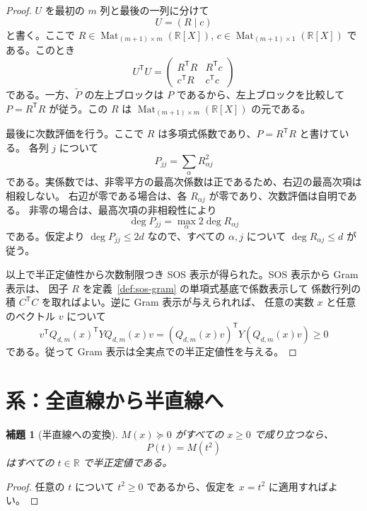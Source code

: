 \documentclass[uplatex,dvipdfmx]{jsarticle}
\newcommand{\Poly}{\mathbb{R}[X]}
\newcommand{\Mat}{\operatorname{Mat}}
\newcommand{\psd}{\succeq 0}
\theoremstyle{matrixsosdefinition}
\newtheorem{lemma}[theorem]{補題}
\begin{document}
\begin{proof}
    \(U\) を最初の \(m\) 列と最後の一列に分けて
  \[
    U=(R\mid c)
  \]
  と書く。ここで \(R\in\Mat_{(m+1)\times m}(\Poly)\),
  \(c\in\Mat_{(m+1)\times1}(\Poly)\) である。このとき
  \[
    U^{\mathsf T}U=
    \begin{pmatrix}
      R^{\mathsf T}R & R^{\mathsf T}c\\
      c^{\mathsf T}R & c^{\mathsf T}c
    \end{pmatrix}
  \]
    である。一方、\(\widetilde P\) の左上ブロックは \(P\) であるから、左上ブロックを比較して
    \(P=R^{\mathsf T}R\) が従う。この \(R\) は
    \(\Mat_{(m+1)\times m}(\Poly)\) の元である。

    最後に次数評価を行う。ここで \(R\) は多項式係数であり、\(P=R^{\mathsf T}R\) と書けている。
    各列 \(j\) について
    \[
      P_{jj}=\sum_\alpha R_{\alpha j}^2
    \]
    である。実係数では、非零平方の最高次係数は正であるため、右辺の最高次項は相殺しない。
    右辺が零である場合は、各 \(R_{\alpha j}\) が零であり、次数評価は自明である。
    非零の場合は、最高次項の非相殺性により
    \[
      \deg P_{jj}=\max_\alpha 2\deg R_{\alpha j}
    \]
    である。仮定より \(\deg P_{jj}\le 2d\) なので、すべての \(\alpha,j\) について
    \(\deg R_{\alpha j}\le d\) が従う。

    以上で半正定値性から次数制限つき SOS 表示が得られた。SOS 表示から Gram 表示は、
    因子 \(R\) を定義~\ref{def:sos-gram} の単項式基底で係数表示して
    係数行列の積 \(C^{\mathsf T}C\) を取ればよい。逆に Gram 表示が与えられれば、
    任意の実数 \(x\) と任意のベクトル \(v\) について
    \[
      v^{\mathsf T}Q_{d,m}(x)^{\mathsf T}YQ_{d,m}(x)v
      =(Q_{d,m}(x)v)^{\mathsf T}Y(Q_{d,m}(x)v)\ge0
    \]
    である。従って Gram 表示は全実点での半正定値性を与える。
\end{proof}

\section{系：全直線から半直線へ}

\begin{lemma}[半直線への変換]\label{lem:half-line-square-pullback}
  \(M(x)\psd\) がすべての \(x\ge0\) で成り立つなら、
  \[
    P(t)=M(t^2)
  \]
  はすべての \(t\in\mathbb{R}\) で半正定値である。
\end{lemma}

\begin{proof}
  任意の \(t\) について \(t^2\ge0\) であるから、仮定を \(x=t^2\) に適用すればよい。
\end{proof}
\end{document}
